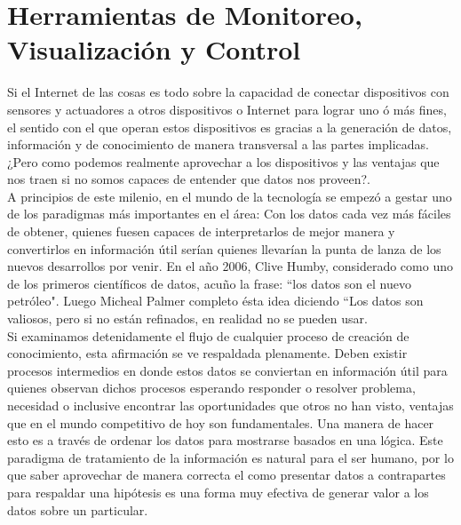 

\chapter{Herramientas de Monitoreo, Visualización y Control}
Si el Internet de las cosas es todo sobre la capacidad de conectar dispositivos con sensores y actuadores a otros dispositivos o Internet para lograr uno ó más fines, el sentido con el que operan estos dispositivos es gracias a la generación de datos, información y de conocimiento de manera transversal a las partes implicadas. ¿Pero como podemos realmente aprovechar a los dispositivos y las ventajas que nos traen si no somos capaces de entender que datos nos proveen?.\\

A principios de este milenio, en el mundo de la tecnología se empezó a gestar uno de los paradigmas más importantes en el área: Con los datos cada vez más fáciles de obtener, quienes fuesen capaces de interpretarlos de mejor manera y convertirlos en información útil serían quienes llevarían la punta de lanza de los nuevos desarrollos por venir. En el año 2006, Clive Humby, considerado como uno de los primeros científicos de datos, acuño la frase: ``los datos son el nuevo petróleo". Luego Micheal Palmer completo ésta idea diciendo ``Los datos son  valiosos, pero si no están refinados, en realidad no se pueden usar\cite{datosPetroleo}.\\

Si examinamos detenidamente el flujo de cualquier proceso de creación de conocimiento, esta afirmación se ve respaldada plenamente. Deben existir procesos intermedios en donde estos datos se conviertan en información útil para quienes observan dichos procesos esperando responder o resolver problema, necesidad o inclusive encontrar las oportunidades que otros no han visto, ventajas que en el mundo competitivo de hoy son fundamentales. Una manera de hacer esto es a través de ordenar los datos para mostrarse basados en una lógica. Este paradigma de tratamiento de la información es natural para el ser humano, por lo que saber aprovechar de manera correcta el como presentar datos a contrapartes para respaldar una hipótesis es una forma muy efectiva de generar valor a los datos sobre un particular.\\

